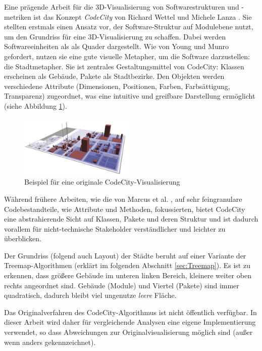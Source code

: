 Eine prägende Arbeit für die 3D-Visualisierung von Softwarestrukturen und -metriken ist das Konzept \textit{CodeCity} von Richard Wettel und Michele Lanza \cite{codeCity1}. Sie stellten erstmals einen Ansatz vor, der Software-Struktur auf Modulebene nutzt, um den Grundriss für eine 3D-Visualisierung zu schaffen. Dabei werden Softwareeinheiten als als Quader dargestellt. Wie von Young und Munro \cite{visSoftwareVR} gefordert, nutzen sie eine gute visuelle Metapher, um die Software darzustellen: die Stadtmetapher. Sie ist zentrales Gestaltungsmittel von CodeCity: Klassen erscheinen als Gebäude, Pakete als Stadtbezirke. Den Objekten werden verschiedene Attribute (Dimensionen, Positionen, Farben, Farbsättigung, Transparenz) zugeordnet, was eine intuitive und greifbare Darstellung ermöglicht (siehe Abbildung \ref{fig:codeCity}).

\begin{figure}
    \centering
    \includegraphics[width=0.5\textwidth]{images/codeCityExample.png}
    \caption{Beispiel für eine originale CodeCity-Visualisierung~\cite[2]{codeCity1}}
    \label{fig:codeCity}
\end{figure}

Während frühere Arbeiten, wie die von Marcus et al. \cite{3dsoftwareMarcus}, auf sehr feingranulare Codebestandteile, wie Attribute und Methoden, fokussierten, bietet CodeCity eine abstrahierende Sicht auf Klassen, Pakete und deren Struktur und ist dadurch vorallem für nicht-technische Stakeholder verständlicher und leichter zu überblicken.

Der Grundriss (folgend auch Layout) der Städte beruht auf einer Variante der Treemap-Algorithmen (erklärt im folgenden Abschnitt \ref{sec:Treemap}). Es ist zu erkennen, dass größere Gebäude im unteren linken Bereich, kleinere weiter oben rechts angeordnet sind. Gebäude (Module) und Viertel (Pakete) sind immer quadratisch, dadurch bleibt viel ungenutze \textit{leere} Fläche. 

Das Originalverfahren des CodeCity-Algorithmus ist nicht öffentlich verfügbar. In dieser Arbeit wird daher für vergleichende Analysen eine eigene Implementierung verwendet, so dass Abweichungen zur Originalvisualisierung möglich sind (außer wenn anders gekennzeichnet).

